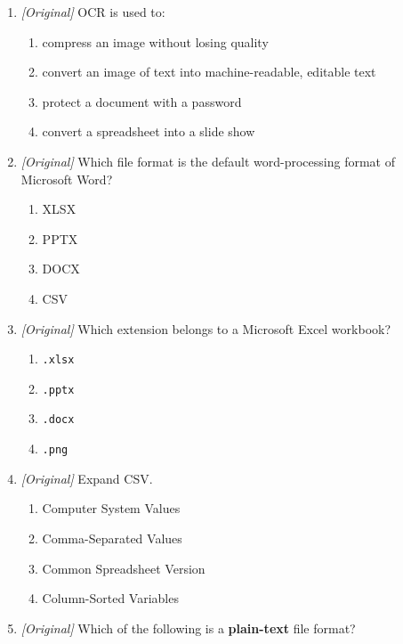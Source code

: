 \begin{enumerate}[label=\textbf{Q\arabic*.}, leftmargin=*]
\begin{enumerate}[label=\Alph*.]
    \item Optical Code Reader
    \item Optical Character Recognition
    \item Online Content Retrieval
    \item Output Character Rendering
  \end{enumerate}
\item \textit{[Original]} OCR is used to:
  \begin{enumerate}[label=\Alph*.]
    \item compress an image without losing quality
    \item convert an image of text into machine-readable, editable text
    \item protect a document with a password
    \item convert a spreadsheet into a slide show
  \end{enumerate}
\item \textit{[Original]} Which file format is the default word-processing
  format of Microsoft Word?
  \begin{enumerate}[label=\Alph*.]
    \item XLSX
    \item PPTX
    \item DOCX
    \item CSV
  \end{enumerate}
\item \textit{[Original]} Which extension belongs to a Microsoft Excel
  workbook?
  \begin{enumerate}[label=\Alph*.]
    \item \texttt{.xlsx}
    \item \texttt{.pptx}
    \item \texttt{.docx}
    \item \texttt{.png}
  \end{enumerate}
\item \textit{[Original]} Expand CSV.
  \begin{enumerate}[label=\Alph*.]
    \item Computer System Values
    \item Comma-Separated Values
    \item Common Spreadsheet Version
    \item Column-Sorted Variables
  \end{enumerate}
\item \textit{[Original]} Which of the following is a \textbf{plain-text}
  file format?

\end{enumerate}

